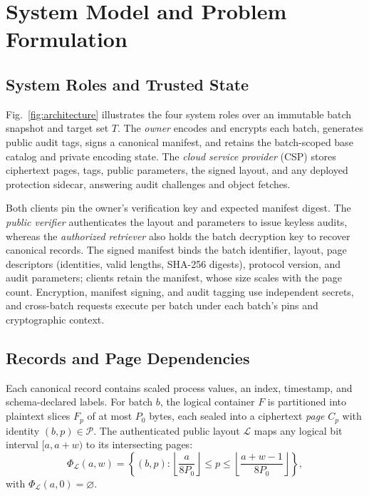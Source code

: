 \documentclass[10pt,journal]{IEEEtran}
\begin{document}
\section{System Model and Problem Formulation}\label{sec:model}
\subsection{System Roles and Trusted State}
Fig.~\ref{fig:architecture} illustrates the four system roles over an immutable batch snapshot and target set $T$. The \emph{owner} encodes and encrypts each batch, generates public audit tags, signs a canonical manifest, and retains the batch-scoped base catalog and private encoding state. The \emph{cloud service provider} (CSP) stores ciphertext pages, tags, public parameters, the signed layout, and any deployed protection sidecar, answering audit challenges and object fetches.

Both clients pin the owner's verification key and expected manifest digest. The \emph{public verifier} authenticates the layout and parameters to issue keyless audits, whereas the \emph{authorized retriever} also holds the batch decryption key to recover canonical records. The signed manifest binds the batch identifier, layout, page descriptors (identities, valid lengths, SHA-256 digests), protocol version, and audit parameters; clients retain the manifest, whose size scales with the page count. Encryption, manifest signing, and audit tagging use independent secrets, and cross-batch requests execute per batch under each batch's pins and cryptographic context.

\subsection{Records and Page Dependencies}
Each canonical record contains scaled process values, an index, timestamp, and schema-declared labels. For batch $b$, the logical container $F$ is partitioned into plaintext slices $F_p$ of at most $P_0$ bytes, each sealed into a ciphertext \emph{page} $C_p$ with identity $(b,p)\in\mathcal P$. The authenticated public layout $\mathcal L$ maps any logical bit interval $[a,a+w)$ to its intersecting pages:
\begin{equation}\label{eq:phi}
\Phi_{\mathcal L}(a,w)=
\left\{(b,p):\left\lfloor\frac{a}{8P_0}\right\rfloor
\leq p\leq\left\lfloor\frac{a+w-1}{8P_0}\right\rfloor\right\},
\end{equation}
with $\Phi_{\mathcal L}(a,0)=\varnothing$.
\end{document}
